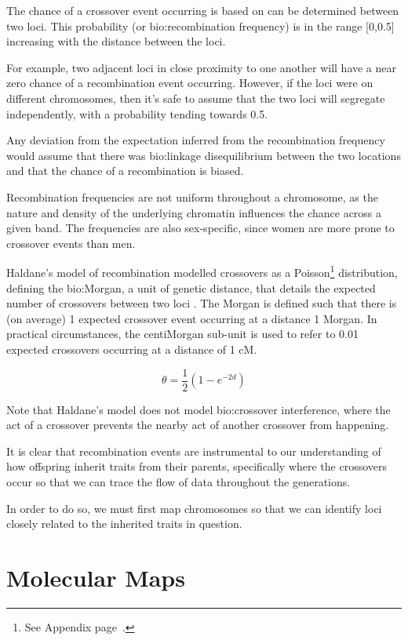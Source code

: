 The chance of a crossover event occurring is based on can be determined between two loci. This probability (or \gls{bio:recombination  frequency}) is in the range [0,0.5] increasing with the distance between the loci.

For example,  two adjacent loci in close proximity to one another will have a near zero chance of a recombination event occurring. However, if the loci were on different chromosomes, then it's safe to assume that the two loci will segregate independently, with a probability tending towards 0.5.

Any deviation from the expectation inferred from the recombination frequency would assume that there was \gls{bio:linkage disequilibrium} between the two locations and that the chance of a recombination is biased.

Recombination frequencies are not uniform throughout a chromosome, as the nature and density of the underlying chromatin influences the chance across a given band. The frequencies are also sex-specific, since women are more prone to crossover events than men.

Haldane's model of recombination modelled crossovers as a Poisson\footnote{See Appendix page~\pageref{ref:app:poisson}.} distribution, defining the \gls{bio:Morgan}, a unit of genetic distance, that details the expected number of crossovers between two loci \cite{haldane1919combination}. The Morgan is defined such that there is (on average) 1 expected crossover event occurring at a distance 1 Morgan.  In practical circumstances, the centiMorgan sub-unit is used to refer to 0.01 expected crossovers occurring at a distance of 1 cM. 

\begin{equation}
\theta = \frac{1}{2} (1 -  e^{-2d})
\label{eqn:morgan}
\end{equation}

Note that Haldane's model does not model \gls{bio:crossover interference}, where the act of a crossover prevents the nearby act of another crossover from happening. 

It is clear that recombination events are instrumental to our understanding of how offspring inherit traits from their parents, specifically where the crossovers occur so that we can trace the flow of data throughout the generations.

In order to do so, we must first map chromosomes so that we can identify loci closely related to the inherited traits in question. 

\section{Molecular Maps}

